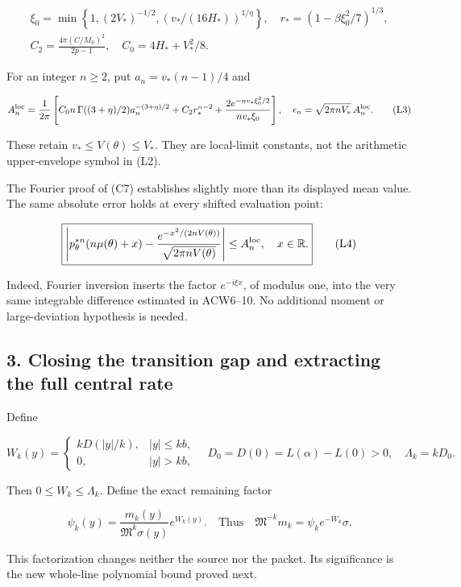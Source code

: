 \documentclass[11pt,a4paper]{article}
\begin{document}
\[
\begin{gathered}
\xi_0=\min\left\{1,(2V_*)^{-1/2},
(v_*/(16H_*))^{1/\eta}\right\},\quad
r_*=(1-\beta\xi_0^2/7)^{1/3},\\
C_2=\frac{4\pi(C/M_0)^2}{2p-1},\quad C_0=4H_*+V_*^2/8.
\end{gathered}
\]

For an integer \(n\ge2\), put \(a_n=v_*(n-1)/4\) and

\[
A_n^{\rm loc}=\frac1{2\pi}\left[
C_0n\,\Gamma((3+\eta)/2)a_n^{-(3+\eta)/2}
+C_2r_*^{n-2}+
\frac{2e^{-nv_*\xi_0^2/2}}{nv_*\xi_0}\right],
\quad\epsilon_n=\sqrt{2\pi nV_*}\,A_n^{\rm loc}.
\tag{L3}
\]

These retain \(v_*\le V(\theta)\le V_*\). They are local-limit constants, not the arithmetic upper-envelope symbol in (L2).

The Fourier proof of (C7) establishes slightly more than its displayed mean value. The same absolute error holds at every shifted evaluation point:

\[
\boxed{\left|p_\theta^{*n}(n\mu(\theta)+x)
-\frac{e^{-x^2/(2nV(\theta))}}{\sqrt{2\pi nV(\theta)}}\right|
\le A_n^{\rm loc},\quad x\in\mathbb R.}
\tag{L4}
\]

Indeed, Fourier inversion inserts the factor \(e^{-i\xi x}\), of modulus one, into the very same integrable difference estimated in ACW6--10. No additional moment or large-deviation hypothesis is needed.

\subsection{3. Closing the transition gap and extracting the full central rate}\label{loc:closing-the-transition-gap-and-extracting-the-full-central-rate}

Define

\[
W_k(y)=\begin{cases}kD(|y|/k),&|y|\le kb,\\0,&|y|>kb,
\end{cases}\quad
D_0=D(0)=L(\alpha)-L(0)>0,\quad\Lambda_k=kD_0.
\tag{L5}
\]

Then \(0\le W_k\le\Lambda_k\). Define the exact remaining factor

\[
\psi_k(y)=\frac{m_k(y)}{\mathfrak M^k\sigma(y)}e^{W_k(y)}.
\quad\text{Thus}\quad
\boxed{\mathfrak M^{-k}m_k=\psi_k e^{-W_k}\sigma.}
\tag{L6}
\]

This factorization changes neither the source nor the packet. Its significance is the new whole-line polynomial bound proved next.
\end{document}
